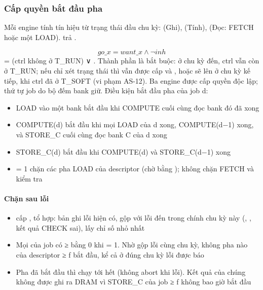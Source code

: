 \documentclass[10pt,a4paper]{article}
\begin{document}
\subsubsection{Cấp quyền bắt đầu pha}\label{sec:6.3}
Mỗi engine tính tín hiệu  từ trạng thái đầu chu kỳ:  (Ghi),  (Tính),  (Đọc: FETCH hoặc một LOAD).  trả .

\[
go\_x = want\_x \wedge \neg inh
\]
 = (ctrl không ở T\_RUN) ∨ . Thành phần  là bắt buộc: ở chu kỳ  đến, ctrl vẫn còn ở T\_RUN; nếu chỉ xét trạng thái thì  vẫn được cấp và ,  hoặc  sẽ lên ở chu kỳ kế tiếp, khi ctrl đã ở T\_SOFT (vi phạm AS-12). Ba engine được cấp quyền độc lập; thứ tự job do bộ đếm bank giữ. Điều kiện bắt đầu pha của job d:
\begin{itemize}
\item LOAD vào một bank bắt đầu khi COMPUTE cuối cùng đọc bank đó đã xong
\item COMPUTE(d) bắt đầu khi mọi LOAD của d xong, COMPUTE(d−1) xong, và STORE\_C cuối cùng đọc bank C của d xong
\item STORE\_C(d) bắt đầu khi COMPUTE(d) và STORE\_C(d−1) xong
\item {} = 1 chặn các pha LOAD của descriptor (chờ  bằng ); không chặn FETCH và kiểm tra
\end{itemize}

\paragraph{Chặn sau lỗi}\label{par:6-4}
\begin{itemize}
\item {} cấp ,  tổ hợp: bản ghi lỗi hiện có, gộp với lỗi đến trong chính chu kỳ này (, , kết quả CHECK sai), lấy chỉ số nhỏ nhất
\item Mọi  của job có  ≥  bằng 0 khi  = 1. Nhờ gộp lỗi cùng chu kỳ, không pha nào của descriptor ≥ f bắt đầu, kể cả ở đúng chu kỳ lỗi được báo
\item Pha đã bắt đầu thì chạy tới hết (không abort khi lỗi). Kết quả của chúng không được ghi ra DRAM vì STORE\_C của job ≥ f không bao giờ bắt đầu
\end{itemize}

\end{document}
